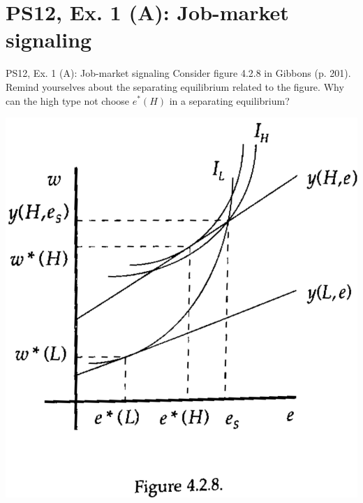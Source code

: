 \section{PS12, Ex. 1 (A): Job-market signaling}

\begin{frame}{PS12, Ex. 1 (A): Job-market signaling}
  Consider figure 4.2.8 in Gibbons (p. 201). Remind yourselves about the separating equilibrium related to the figure. Why can the high type not choose $e^*(H)$ in a separating equilibrium?\vspace{-8pt}
    \begin{multicols}{2}
      \vfill\null\columnbreak
      \includegraphics[width=1.1\columnwidth]{figures/Gibbons428}
      \vfill\null
    \end{multicols}
\end{frame}
